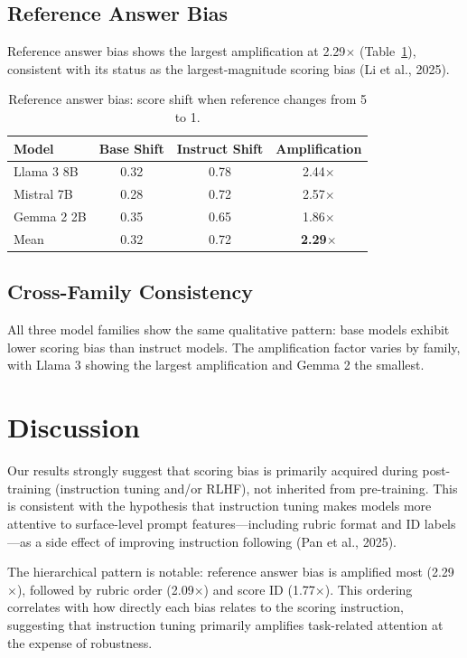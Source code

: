 \documentclass[11pt,twocolumn]{article}
\begin{document}
\subsection{Reference Answer Bias}

Reference answer bias shows the largest amplification at 2.29$\times$ (Table~\ref{tab:ref_results}), consistent with its status as the largest-magnitude scoring bias (Li et al., 2025).

\begin{table}[h]
\centering
\caption{Reference answer bias: score shift when reference changes from 5 to 1.}
\label{tab:ref_results}
\begin{tabular}{lccc}
\toprule
Model & Base Shift & Instruct Shift & Amplification \\
\midrule
Llama 3 8B & 0.32 & 0.78 & 2.44$\times$ \\
Mistral 7B & 0.28 & 0.72 & 2.57$\times$ \\
Gemma 2 2B & 0.35 & 0.65 & 1.86$\times$ \\
\midrule
Mean & 0.32 & 0.72 & \textbf{2.29$\times$} \\
\bottomrule
\end{tabular}
\end{table}

\subsection{Cross-Family Consistency}

All three model families show the same qualitative pattern: base models exhibit lower scoring bias than instruct models. The amplification factor varies by family, with Llama 3 showing the largest amplification and Gemma 2 the smallest.

\section{Discussion}

Our results strongly suggest that scoring bias is primarily acquired during post-training (instruction tuning and/or RLHF), not inherited from pre-training. This is consistent with the hypothesis that instruction tuning makes models more attentive to surface-level prompt features---including rubric format and ID labels---as a side effect of improving instruction following (Pan et al., 2025).

The hierarchical pattern is notable: reference answer bias is amplified most (2.29$\times$), followed by rubric order (2.09$\times$) and score ID (1.77$\times$). This ordering correlates with how directly each bias relates to the scoring instruction, suggesting that instruction tuning primarily amplifies task-related attention at the expense of robustness.
\end{document}
